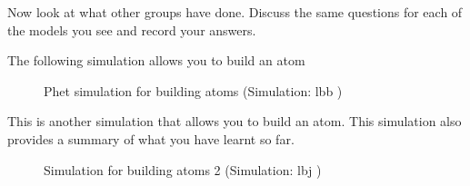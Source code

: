         \label{m38741*id260596}Now look at what other groups have done. Discuss the same questions for each of the models you see and record your answers. \par 
      \label{m38741*eip-816}The following simulation allows you to build an atom\newline
    \setcounter{subfigure}{0}
	\begin{figure}[H] %
    \textnormal{Phet simulation for building atoms}\vspace{.1in} \nopagebreak
  \label{m38806*phet!!!underscore!!!sim}\label{m38806*phet-simulation}
             { (Simulation:  lbb )}
      \vspace{2pt}
    \vspace{.1in}
 \end{figure}       
\par \label{m38741*eip-583}This is another simulation that allows you to build an atom. This simulation also provides a summary of what you have learnt so far. \newline
    \setcounter{subfigure}{0}
	\begin{figure}[H] %
    \textnormal{Simulation for building atoms 2}\vspace{.1in} \nopagebreak
  \label{m38806*phet!!!underscore!!!sim}\label{m38806*phet-simulation}
             { (Simulation:  lbj )}
      \vspace{2pt}
    \vspace{.1in}
 \end{figure}       
    \par 
    \label{m38741*cid10}
